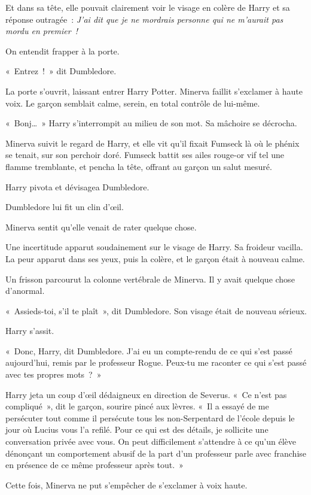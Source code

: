 Et dans sa tête, elle pouvait clairement voir le visage en colère de Harry et sa réponse outragée~: \emph{J'ai dit que je ne mordrais personne qui ne m'aurait pas mordu en premier~!}

On entendit frapper à la porte.

«~Entrez~!~» dit Dumbledore.

La porte s'ouvrit, laissant entrer Harry Potter.
Minerva faillit s'exclamer à haute voix.
Le garçon semblait calme, serein, en total contrôle de lui-même.

«~Bonj…~» Harry s'interrompit au milieu de son mot.
Sa mâchoire se décrocha.

Minerva suivit le regard de Harry, et elle vit qu'il fixait Fumseck là où le phénix se tenait, sur son perchoir doré.
Fumseck battit ses ailes rouge-or vif tel une flamme tremblante, et pencha la tête, offrant au garçon un salut mesuré.

Harry pivota et dévisagea Dumbledore.

Dumbledore lui fit un clin d'œil.

Minerva sentit qu'elle venait de rater quelque chose.

Une incertitude apparut soudainement sur le visage de Harry.
Sa froideur vacilla.
La peur apparut dans ses yeux, puis la colère, et le garçon était à nouveau calme.

Un frisson parcourut la colonne vertébrale de Minerva.
Il y avait quelque chose d'anormal.

«~Assieds-toi, s'il te plaît~», dit Dumbledore.
Son visage était de nouveau sérieux.

Harry s'assit.

«~Donc, Harry, dit Dumbledore.
J'ai eu un compte-rendu de ce qui s'est passé aujourd'hui, remis par le professeur Rogue.
Peux-tu me raconter ce qui s'est passé avec tes propres mots~?~»

Harry jeta un coup d'œil dédaigneux en direction de Severus.
«~Ce n'est pas compliqué~», dit le garçon, sourire pincé aux lèvres.
«~Il a essayé de me persécuter tout comme il persécute tous les non-Serpentard de l'école depuis le jour où Lucius vous l'a refilé.
Pour ce qui est des détails, je sollicite une conversation privée avec vous.
On peut difficilement s'attendre à ce qu'un élève dénonçant un comportement abusif de la part d'un professeur parle avec franchise en présence de ce même professeur après tout.~»

Cette fois, Minerva ne put s'empêcher de s'exclamer à voix haute.

